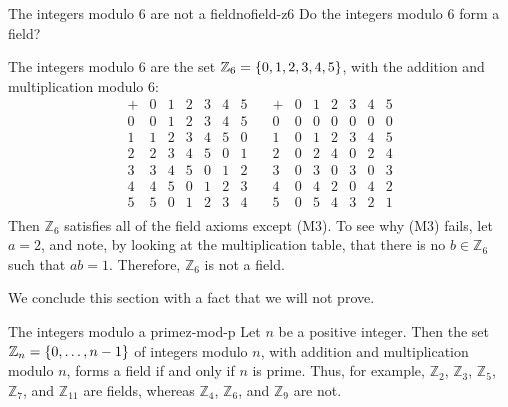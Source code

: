 \begin{example}{The integers modulo 6 are not a field}{nofield-z6}
  Do the integers modulo 6 form a field? 
\end{example}

\begin{solution}
  The integers modulo 6 are the set $\mathbb{Z}_6=\{0,1,2,3,4,5\}$, with the
  addition and multiplication modulo 6:
    \[ \begin{array}{l|llllll}
    +&0&1&2&3&4&5 \\\hline
    0&0&1&2&3&4&5 \\
    1&1&2&3&4&5&0 \\
    2&2&3&4&5&0&1 \\
    3&3&4&5&0&1&2 \\
    4&4&5&0&1&2&3 \\
    5&5&0&1&2&3&4 \\
  \end{array}
  \quad
  \begin{array}{l|llllll}
    +&0&1&2&3&4&5 \\\hline
    0&0&0&0&0&0&0 \\
    1&0&1&2&3&4&5 \\
    2&0&2&4&0&2&4 \\
    3&0&3&0&3&0&3 \\
    4&0&4&2&0&4&2 \\
    5&0&5&4&3&2&1 \\
  \end{array}
  \]
  Then $\mathbb{Z}_6$ satisfies all of the field axioms except
  (M3). To see why (M3) fails, let $a=2$, and note, by looking at the
  multiplication table, that there is no $b\in\mathbb{Z}_6$ such that
  $ab=1$. Therefore, $\mathbb{Z}_6$ is not a field.
\end{solution}

We conclude this section with a fact that we will not prove.

\begin{theorem}{The integers modulo a prime}{z-mod-p}
  Let $n$ be a positive integer. Then the set
  $\mathbb{Z}_n=\{0,\ldots,n-1\}$ of integers modulo $n$, with
  addition and multiplication modulo $n$, forms a field if and only if
  $n$ is prime. Thus, for example, $\mathbb{Z}_2$, $\mathbb{Z}_3$,
  $\mathbb{Z}_5$, $\mathbb{Z}_7$, and $\mathbb{Z}_{11}$ are fields,
  whereas $\mathbb{Z}_4$, $\mathbb{Z}_6$, and $\mathbb{Z}_9$ are not.
\end{theorem}
